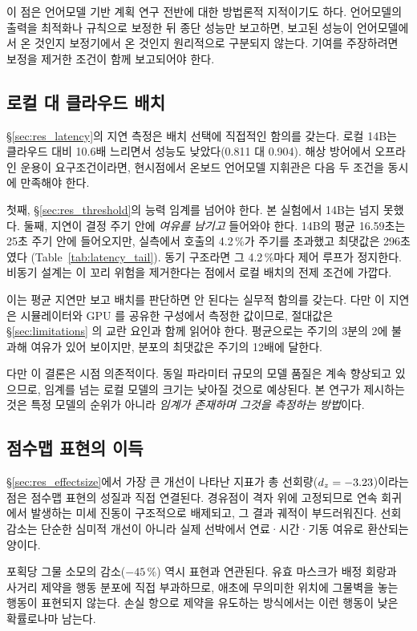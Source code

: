 이 점은 언어모델 기반 계획 연구 전반에 대한 방법론적 지적이기도 하다. 언어모델의 출력을
최적화나 규칙으로 보정한 뒤 종단 성능만 보고하면, 보고된 성능이 언어모델에서 온 것인지
보정기에서 온 것인지 원리적으로 구분되지 않는다. 기여를 주장하려면 보정을 제거한 조건이
함께 보고되어야 한다.

\subsection{로컬 대 클라우드 배치}

\S\ref{sec:res_latency}의 지연 측정은 배치 선택에 직접적인 함의를 갖는다. 로컬 14B는
클라우드 대비 10.6배 느리면서 성능도 낮았다(0.811 대 0.904). 해상 방어에서 오프라인 운용이
요구조건이라면, 현시점에서 온보드 언어모델 지휘관은 다음 두 조건을 동시에 만족해야 한다.

첫째, \S\ref{sec:res_threshold}의 능력 임계를 넘어야 한다. 본 실험에서 14B는 넘지 못했다.
둘째, 지연이 결정 주기 안에 \emph{여유를 남기고} 들어와야 한다. 14B의 평균 16.59초는 25초
주기 안에 들어오지만, 실측에서 호출의 4.2\,\%가 주기를 초과했고 최댓값은 296초였다
(Table~\ref{tab:latency_tail}). 동기 구조라면 그 4.2\,\%마다 제어 루프가 정지한다. 비동기
설계는 이 꼬리 위험을 제거한다는 점에서 로컬 배치의 전제 조건에 가깝다.

이는 평균 지연만 보고 배치를 판단하면 안 된다는 실무적 함의를 갖는다. 다만 이 지연은 시뮬레이터와 GPU 를 공유한 구성에서 측정한 값이므로, 절대값은 \S\ref{sec:limitations} 의 교란 요인과 함께 읽어야 한다. 평균으로는 주기의
3분의 2에 불과해 여유가 있어 보이지만, 분포의 최댓값은 주기의 12배에 달한다.

다만 이 결론은 시점 의존적이다. 동일 파라미터 규모의 모델 품질은 계속 향상되고 있으므로,
임계를 넘는 로컬 모델의 크기는 낮아질 것으로 예상된다. 본 연구가 제시하는 것은 특정 모델의
순위가 아니라 \emph{임계가 존재하며 그것을 측정하는 방법}이다.

\subsection{점수맵 표현의 이득}

\S\ref{sec:res_effectsize}에서 가장 큰 개선이 나타난 지표가 총 선회량($d_z = -3.23$)이라는
점은 점수맵 표현의 성질과 직접 연결된다. 경유점이 격자 위에 고정되므로 연속 회귀에서
발생하는 미세 진동이 구조적으로 배제되고, 그 결과 궤적이 부드러워진다. 선회 감소는 단순한
심미적 개선이 아니라 실제 선박에서 연료·시간·기동 여유로 환산되는 양이다.

포획당 그물 소모의 감소($-45\,\%$) 역시 표현과 연관된다. 유효 마스크가 배정 회랑과 사거리
제약을 행동 분포에 직접 부과하므로, 애초에 무의미한 위치에 그물벽을 놓는 행동이 표현되지
않는다. 손실 항으로 제약을 유도하는 방식에서는 이런 행동이 낮은 확률로나마 남는다.
